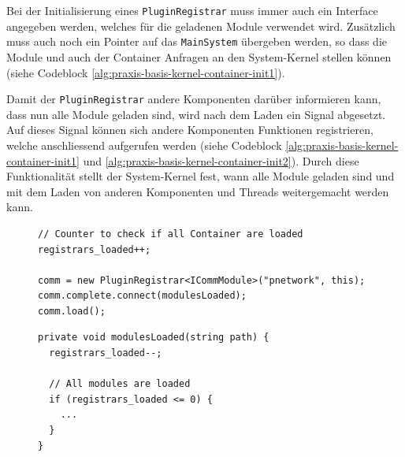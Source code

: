 Bei der Initialisierung eines \texttt{PluginRegistrar} muss immer auch ein Interface angegeben werden, welches f\"ur die geladenen Module verwendet wird. Zus\"atzlich muss auch noch ein Pointer auf das \texttt{MainSystem} \"ubergeben werden, so dass die Module und auch der Container Anfragen an den System-Kernel stellen k\"onnen (siehe Codeblock \ref{alg:praxis-basis-kernel-container-init1}).

Damit der \texttt{PluginRegistrar} andere Komponenten dar\"uber informieren kann, dass nun alle Module geladen sind, wird nach dem Laden ein Signal abgesetzt. Auf dieses Signal k\"onnen sich andere Komponenten Funktionen registrieren, welche anschliessend aufgerufen werden (siehe Codeblock \ref{alg:praxis-basis-kernel-container-init1} und \ref{alg:praxis-basis-kernel-container-init2}). Durch diese Funktionalit\"at stellt der System-Kernel fest, wann alle Module geladen sind und mit dem Laden von anderen Komponenten und Threads weitergemacht werden kann.

\begin{figure}[h]
 \lstset{language=[ISO]C++}
 \begin{lstlisting}[label=alg:praxis-basis-kernel-container-init1,caption={[Initialisierung eines Modul-Containers]Dieser Modul-Container l\"adt alle Module im Verzeichnis \texttt{pnetwork} und ruft nach dem erfolgreichen Laden die Funktion \texttt{modulesLoaded} (siehe Codeblock \ref{alg:praxis-basis-kernel-container-init2}) aus dem MainSystem auf. Durch den \texttt{load()}-Aufruf wird der Ladevorgang gestartet.}]
// Counter to check if all Container are loaded
registrars_loaded++;

comm = new PluginRegistrar<ICommModule>("pnetwork", this);
comm.complete.connect(modulesLoaded);
comm.load();
 \end{lstlisting}
\end{figure}

\begin{figure}[h]
 \lstset{language=[ISO]C++}
 \begin{lstlisting}[label=alg:praxis-basis-kernel-container-init2,caption={[Pr\"ufung, ob bereits alle Modul-Container geladen sind]Eine Funktion, die an das \texttt{complete}-Signal des \texttt{PluginRegistrar} gebunden wird, muss \"uber den Parameter \texttt{string path} verf\"ugen. Dieser beinhaltet den Pfad der Module. Diese Implementierung zeigt, wie gew\"ahrleistet wird, dass erst nach dem Laden aller Container gewisse Funktionen ausgef\"uhrt werden.}]
private void modulesLoaded(string path) {
  registrars_loaded--;

  // All modules are loaded
  if (registrars_loaded <= 0) {
    ...
  }
}
 \end{lstlisting}
\end{figure}

